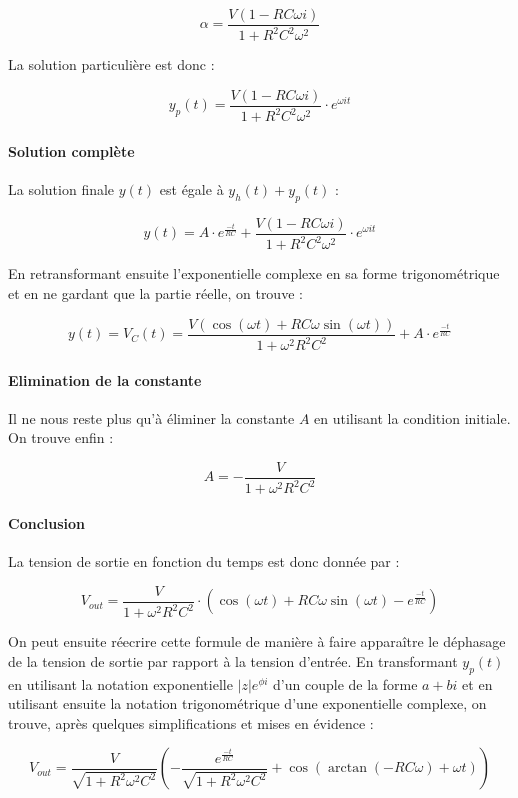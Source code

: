 $$\alpha = \frac{V(1-RC\omega i)}{1+R^2C^2\omega^2}$$

La solution particulière est donc :

$$y_p(t) = \frac{V(1-RC\omega i)}{1+R^2C^2\omega^2} \cdot e^{\omega i t}$$

\paragraph{Solution complète}

La solution finale $y(t)$ est égale à $y_h(t) + y_p(t)$ :

$$y(t) = A \cdot e^{\frac{-t}{RC}} + \frac{V(1-RC\omega i)}{1+R^2C^2\omega^2} \cdot e^{\omega i t}$$

En retransformant ensuite l'exponentielle complexe en sa forme trigonométrique et en ne
gardant que la partie réelle, on trouve :

$$y(t) = V_C(t) = \frac{V(\cos (\omega t) + RC\omega \sin (\omega t))}{1 + \omega^2R^2C^2} + A \cdot e^{\frac{-t}{RC}}$$

\paragraph{Elimination de la constante}

Il ne nous reste plus qu'à éliminer la constante $A$ en utilisant la condition initiale.
On trouve enfin :

$$A = -\frac{V}{1 + \omega^2R^2C^2}$$                         

\paragraph{Conclusion}

La tension de sortie en fonction du temps est donc donnée par :

$$V_{out} = \frac{V}{1 + \omega^2R^2C^2} \cdot (\cos (\omega t) + RC\omega \sin (\omega t) - e^{\frac{-t}{RC}})$$

On peut ensuite réecrire cette formule de manière à faire apparaître
le déphasage de la tension de sortie par rapport à la tension d'entrée. En transformant
$y_p(t)$ en utilisant la notation exponentielle $|z|e^{\phi i}$ d'un couple de la forme 
$a+bi$ et en utilisant ensuite la notation trigonométrique d'une exponentielle complexe,
on trouve, après quelques simplifications et mises en évidence :

$$V_{out} = \frac{V}{\sqrt{1 + R^2\omega^2C^2}}
(-\frac{e^{\frac{-t}{RC}}}{\sqrt{1 + R^2\omega^2C^2}} + \cos(\arctan(-RC\omega) + \omega t))$$


